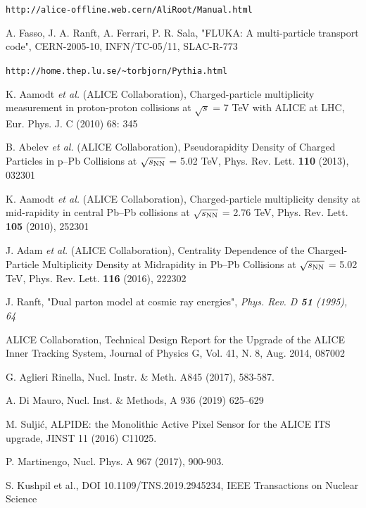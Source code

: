 \begin{thebibliography}{99}
 \verb+http://alice-offline.web.cern/AliRoot/Manual.html+

 A. Fasso, J. A. Ranft,  A. Ferrari, P. R.  Sala, "FLUKA: A multi-particle transport code",
CERN-2005-10, INFN/TC-05/11, SLAC-R-773

 \verb+http://home.thep.lu.se/~torbjorn/Pythia.html+

 K. Aamodt {\it et al.} (ALICE Collaboration), Charged-particle multiplicity measurement in proton-proton collisions at $\sqrt{s}$ = 7 TeV with ALICE at LHC,
Eur. Phys. J. C (2010) 68: 345

 B. Abelev {\it et al.} (ALICE Collaboration), Pseudorapidity Density of Charged Particles in p--Pb Collisions at $\sqrt{s_{\rm{NN}}}$ = 5.02 TeV,
Phys. Rev. Lett. {\bf{110}} (2013), 032301

 K. Aamodt {\it et al.} (ALICE Collaboration), Charged-particle multiplicity density at mid-rapidity in central Pb--Pb collisions at $\sqrt{s_{\rm{NN}}}$ = 2.76 TeV,
Phys. Rev. Lett. {\bf{105}} (2010), 252301

 J. Adam {\it et al.} (ALICE Collaboration), Centrality Dependence of the Charged-Particle Multiplicity Density at Midrapidity in Pb--Pb Collisions at $\sqrt{s_{\rm{NN}}}$ = 5.02 TeV,
Phys. Rev. Lett. {\bf{116}} (2016), 222302


 J. Ranft, "Dual parton model at cosmic ray energies",
\emph{Phys. Rev. D {\bf{51}} (1995), 64}

ALICE Collaboration, Technical Design Report for the Upgrade of the ALICE Inner Tracking System, Journal of Physics G, Vol. 41, N. 8, Aug. 2014, 087002

G. Aglieri Rinella, Nucl. Instr. \& Meth. A845 (2017), 583-587.

A. Di Mauro, Nucl. Inst. \& Methods, A 936 (2019) 625–629

M. Suljić, ALPIDE: the Monolithic Active Pixel Sensor for the ALICE ITS upgrade, JINST 11 (2016) C11025.

P. Martinengo, Nucl. Phys. A 967 (2017), 900-903.

S. Kushpil et al., DOI 10.1109/TNS.2019.2945234, IEEE Transactions on Nuclear Science


\end{thebibliography}
